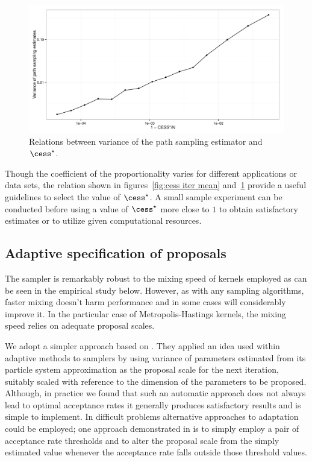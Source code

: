 \begin{figure}[t]
  \includegraphics[width=\linewidth]{fig/CESS_Path_Var}
  \caption{Relations between variance of the path sampling estimator and
    $\cess^\star$.}
  \label{fig:cess path var}
\end{figure}

Though the coefficient of the proportionality varies for different
applications or data sets, the relation shown in figures~\ref{fig:cess iter
  mean} and~\ref{fig:cess path var} provide a useful guidelines to select the
value of $\cess^\star$. A small sample experiment can be conducted before using a
value of $\cess^\star$ more close to $1$ to obtain satisfactory estimates or to
utilize given computational resources.

\subsection{Adaptive specification of proposals}
\label{sub:Adaptive specification of proposals}

The \smc sampler is remarkably robust to the mixing speed of \mcmc kernels
employed as can be seen in the empirical study below. However, as with any
sampling algorithms, faster mixing doesn't harm performance and in some cases
will considerably improve it. In the particular case of Metropolis-Hastings
kernels, the mixing speed relies on adequate proposal scales.

We adopt a simpler approach based on \cite{Jasra:2010eh}. They applied an idea
used within adaptive \mcmc methods \cite{Andrieu:2006tw} to \smc samplers by
using variance of parameters estimated from its particle system approximation
as the proposal scale for the next iteration, suitably scaled with reference
to the dimension of the parameters to be proposed. Although, in practice we
found that such an automatic approach does not always lead to optimal
acceptance rates it generally produces satisfactory results and is simple to
implement. In difficult problems alternative approaches to adaptation could be
employed; one approach demonstrated in \cite{Jasra:2010eh} is to simply employ
a pair of acceptance rate thresholds and to alter the proposal scale from the
simply estimated value whenever the acceptance rate falls outside those
threshold values.

